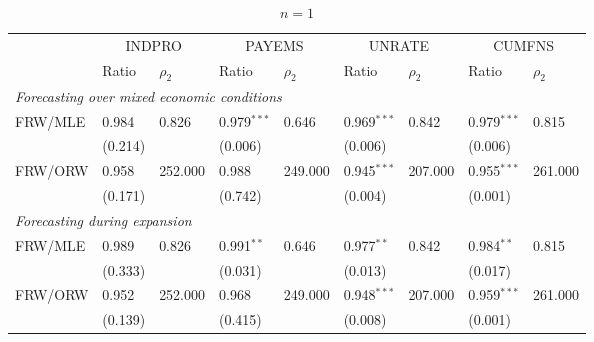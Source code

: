\begin{table}[h]
\begin{subtable}{\textwidth}
\centering
\small
\begin{tabular}{lllllllll}
\toprule
 & \multicolumn{2}{c}{INDPRO} & \multicolumn{2}{c}{PAYEMS} & \multicolumn{2}{c}{UNRATE} & \multicolumn{2}{c}{CUMFNS} \\
 & Ratio & $\rho_2$ & Ratio & $\rho_2$ & Ratio & $\rho_2$ & Ratio & $\rho_2$ \\
\midrule
\multicolumn{9}{l}{\textit{Forecasting over mixed economic conditions}}\\\midrule
FRW/MLE & 0.984 & 0.826 & 0.979$^{***}$ & 0.646 & 0.969$^{***}$ & 0.842 & 0.979$^{***}$ & 0.815 \\
 & (0.214) &  & (0.006) &  & (0.006) &  & (0.006) &  \\[1ex]
FRW/ORW & 0.958 & 252.000 & 0.988 & 249.000 & 0.945$^{***}$ & 207.000 & 0.955$^{***}$ & 261.000 \\
 & (0.171) &  & (0.742) &  & (0.004) &  & (0.001) &  \\[1ex]
\midrule
\multicolumn{9}{l}{\textit{Forecasting during expansion}}\\\midrule
FRW/MLE & 0.989 & 0.826 & 0.991$^{**}$ & 0.646 & 0.977$^{**}$ & 0.842 & 0.984$^{**}$ & 0.815 \\
 & (0.333) &  & (0.031) &  & (0.013) &  & (0.017) &  \\[1ex]
FRW/ORW & 0.952 & 252.000 & 0.968 & 249.000 & 0.948$^{***}$ & 207.000 & 0.959$^{***}$ & 261.000 \\
 & (0.139) &  & (0.415) &  & (0.008) &  & (0.001) &  \\[1ex]
\bottomrule
\end{tabular}
\caption{$n=1$}
\label{tab:ext1}
\end{subtable}

\vspace{1em}


\end{table}
